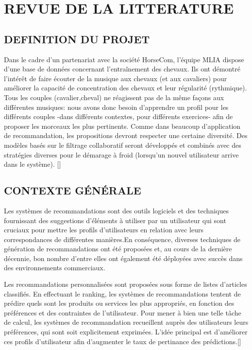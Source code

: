 \chapter{REVUE DE LA LITTERATURE}
\thispagestyle{empty} 
\section{DEFINITION DU PROJET}

Dans le cadre d'un partenariat avec la société HorseCom, l'équipe MLIA dispose d'une base de données concernant l'entraînement des chevaux. Ils ont démontré l'intérêt de faire écouter de la musique aux chevaux (et aux cavaliers) pour améliorer la capacité de concentration des chevaux et leur régularité (rythmique). Tous les couples (cavalier,cheval) ne réagissent pas de la même façons aux différentes musiques: nous avons donc besoin d'apprendre un profil pour les différents couples -dans différents contextes, pour différents exercices- afin de proposer les morceaux les plus pertinents. Comme dans beaucoup d'application de recommandation, les propositions devront respecter une certaine diversité. Des modèles basés sur le filtrage collaboratif seront développés et combinés avec des stratégies diverses pour le démarage à froid (lorsqu'un nouvel utilisateur arrive dans le système). [\cite{PLDAC}]

\section{CONTEXTE GÉNÉRALE}

Les systèmes de recommandations sont des outils logiciels et des techniques fournissant des suggestions d'éléments à utiliser par un utilisateur qui sont cruciaux pour mettre les profils d'utilisateurs en relation avec leurs correspondances de différentes manières.En conséquence, diverses techniques de génération de recommandations ont été proposées et, au cours de la dernière décennie, bon nombre d'entre elles ont également été déployées avec succès dans des environnements commerciaux.

Les recommandations personnalisées sont proposées sous forme de listes d'articles classifiés. En effectuant le ranking, les systèmes de recommandations tentent de prédire quels sont les produits ou services les plus appropriés, en fonction des préférences et des contraintes de l'utilisateur. Pour mener à bien une telle tâche de calcul, les systèmes de recommandation recueillent auprès des utilisateurs leurs préférences, qui sont soit explicitement exprimées. L’idée principal est d'améliorer ces profils d'utilisateur afin d'augmenter le taux de pertinance des prédictions.[\cite{ricci2011introduction}] 

